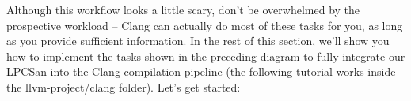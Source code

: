 Although this workflow looks a little scary, don't be overwhelmed by the prospective workload – Clang can actually do most of these tasks for you, as long as you provide sufficient information. In the rest of this section, we'll show you how to implement the tasks shown in the preceding diagram to fully integrate our LPCSan into the Clang compilation pipeline (the following tutorial works inside the llvm-project/clang folder). Let's get started:

























